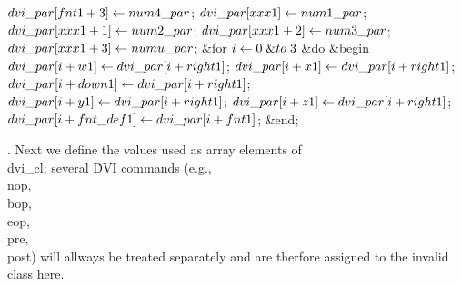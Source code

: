 $\\{dvi\_par}[\\{fnt1}+3]\gets\\{num4\_par}$;\6
$\\{dvi\_par}[\\{xxx1}]\gets\\{num1\_par}$;\5
$\\{dvi\_par}[\\{xxx1}+1]\gets\\{num2\_par}$;\5
$\\{dvi\_par}[\\{xxx1}+2]\gets\\{num3\_par}$;\5
$\\{dvi\_par}[\\{xxx1}+3]\gets\\{numu\_par}$;\6
\&{for} $\hbox{$i$}\gets0\mathrel{\&{to}}3$ \1\&{do}\6
\&{begin} $\\{dvi\_par}[\hbox{$i$}+\\{w1}]\gets\\{dvi\_par}[\hbox{$i$}+\\{right1}]$;\5
$\\{dvi\_par}[\hbox{$i$}+\\{x1}]\gets\\{dvi\_par}[\hbox{$i$}+\\{right1}]$;\5
$\\{dvi\_par}[\hbox{$i$}+\\{down1}]\gets\\{dvi\_par}[\hbox{$i$}+\\{right1}]$;\5
$\\{dvi\_par}[\hbox{$i$}+\\{y1}]\gets\\{dvi\_par}[\hbox{$i$}+\\{right1}]$;\5
$\\{dvi\_par}[\hbox{$i$}+\\{z1}]\gets\\{dvi\_par}[\hbox{$i$}+\\{right1}]$;\5
$\\{dvi\_par}[\hbox{$i$}+\\{fnt\_def1}]\gets\\{dvi\_par}[\hbox{$i$}+\\{fnt1}]$;\6
\&{end};\2\par
\fi

. Next we define the values used as array elements of \\{dvi\_cl};
several \.{DVI} commands (e.g., \\{nop}, \\{bop}, \\{eop}, \\{pre}, \\{post})
will
allways be treated separately and are therfore assigned to the invalid
class here.

